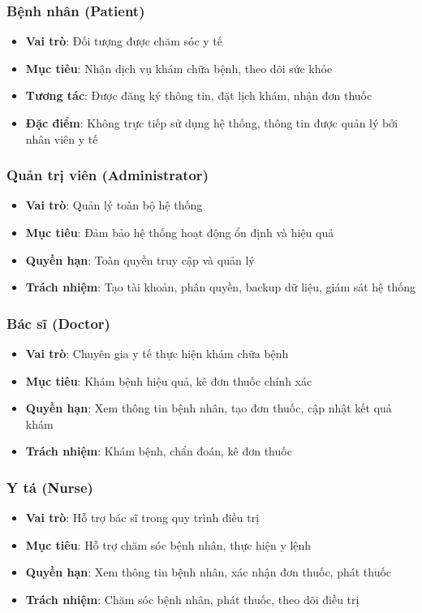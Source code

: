 \documentclass[12pt,a4paper]{report}
\begin{document}
\subsubsection{Bệnh nhân (Patient)}
\begin{itemize}
    \item \textbf{Vai trò}: Đối tượng được chăm sóc y tế
    \item \textbf{Mục tiêu}: Nhận dịch vụ khám chữa bệnh, theo dõi sức khỏe
    \item \textbf{Tương tác}: Được đăng ký thông tin, đặt lịch khám, nhận đơn thuốc
    \item \textbf{Đặc điểm}: Không trực tiếp sử dụng hệ thống, thông tin được quản lý bởi nhân viên y tế
\end{itemize}

\subsubsection{Quản trị viên (Administrator)}
\begin{itemize}
    \item \textbf{Vai trò}: Quản lý toàn bộ hệ thống
    \item \textbf{Mục tiêu}: Đảm bảo hệ thống hoạt động ổn định và hiệu quả
    \item \textbf{Quyền hạn}: Toàn quyền truy cập và quản lý
    \item \textbf{Trách nhiệm}: Tạo tài khoản, phân quyền, backup dữ liệu, giám sát hệ thống
\end{itemize}

\subsubsection{Bác sĩ (Doctor)}
\begin{itemize}
    \item \textbf{Vai trò}: Chuyên gia y tế thực hiện khám chữa bệnh
    \item \textbf{Mục tiêu}: Khám bệnh hiệu quả, kê đơn thuốc chính xác
    \item \textbf{Quyền hạn}: Xem thông tin bệnh nhân, tạo đơn thuốc, cập nhật kết quả khám
    \item \textbf{Trách nhiệm}: Khám bệnh, chẩn đoán, kê đơn thuốc
\end{itemize}

\subsubsection{Y tá (Nurse)}
\begin{itemize}
    \item \textbf{Vai trò}: Hỗ trợ bác sĩ trong quy trình điều trị
    \item \textbf{Mục tiêu}: Hỗ trợ chăm sóc bệnh nhân, thực hiện y lệnh
    \item \textbf{Quyền hạn}: Xem thông tin bệnh nhân, xác nhận đơn thuốc, phát thuốc
    \item \textbf{Trách nhiệm}: Chăm sóc bệnh nhân, phát thuốc, theo dõi điều trị
\end{itemize}
\end{document}

